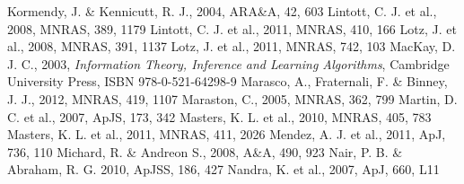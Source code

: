 \documentclass{mn2e}
\begin{document}
\begin{thebibliography}{}
 Kormendy, J. \& Kennicutt, R. J., 2004, ARA\&A, 42, 603
 Lintott, C. J. et al., 2008, MNRAS, 389, 1179
 Lintott, C. J. et al., 2011, MNRAS, 410, 166
 Lotz, J. et al., 2008, MNRAS, 391, 1137
 Lotz, J. et al., 2011, MNRAS, 742, 103
 MacKay, D. J. C., 2003, \emph{Information Theory, Inference and Learning Algorithms}, Cambridge University Press, ISBN 978-0-521-64298-9
 Marasco, A., Fraternali, F. \& Binney, J. J., 2012, MNRAS, 419, 1107
 Maraston, C., 2005, MNRAS, 362, 799
 Martin, D. C. et al., 2007, ApJS, 173, 342
 Masters, K. L. et al., 2010, MNRAS, 405, 783
 Masters, K. L. et al., 2011, MNRAS, 411, 2026
 Mendez, A. J. et al., 2011, ApJ, 736, 110
 Michard, R. \& Andreon S., 2008, A\&A, 490, 923
 Nair, P. B. \& Abraham, R. G. 2010, ApJSS, 186, 427 
 Nandra, K. et al., 2007, ApJ, 660, L11

\end{thebibliography}
\end{document}
